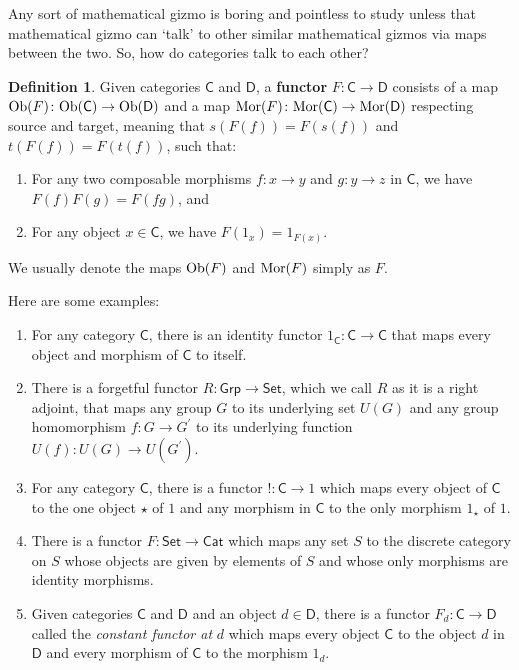 \documentclass[oneside,final]{ucr}
\theoremstyle{definition}
\newtheorem{definition}[theorem]{Definition}
\newcommand{\define}[1]{{\bf \boldmath #1}}
\begin{document}
{Any sort of mathematical gizmo is boring and pointless to study unless that mathematical gizmo can `talk' to other similar mathematical gizmos via maps between the two. So, how do categories talk to each other?

\begin{definition}
Given categories $\mathsf{C}$ and $\mathsf{D}$, a \define{functor} $F \colon \mathsf{C} \to \mathsf{D}$ consists of a map $\textnormal{Ob}(F) \colon \textnormal{Ob}(\mathsf{C}) \to \textnormal{Ob}(\mathsf{D})$ and a map $\textnormal{Mor}(F) \colon \textnormal{Mor}(\mathsf{C}) \to \textnormal{Mor}(\mathsf{D})$ respecting source and target, meaning that $s(F(f))=F(s(f))$ and $t(F(f))=F(t(f))$, such that:
\begin{enumerate}
\item{For any two composable morphisms $f \colon x \to y$ and $g \colon y \to z$ in $\mathsf{C}$, we have $F(f)F(g)=F(fg)$, and}
\item{For any object $x \in \mathsf{C}$, we have $F(1_x) = 1_{F(x)}$.}
\end{enumerate}
We usually denote the maps $\textnormal{Ob}(F)$ and $\textnormal{Mor}(F)$ simply as $F$.
\end{definition}
Here are some examples:
\begin{enumerate}
\item{For any category $\mathsf{C}$, there is an identity functor $1_\mathsf{C} \colon \mathsf{C} \to \mathsf{C}$ that maps every object and morphism of $\mathsf{C}$ to itself.}
\item{There is a forgetful functor $R \colon \mathsf{Grp} \to \mathsf{Set}$, which we call $R$ as it is a right adjoint, that maps any group $G$ to its underlying set $U(G)$ and any group homomorphism $f \colon G \to G^\prime$ to its underlying function $U(f) \colon U(G) \to U(G^\prime)$.}
\item{For any category $\mathsf{C}$, there is a functor $! \colon \mathsf{C} \to 1$ which maps every object of $\mathsf{C}$ to the one object $\star$ of $1$ and any morphism in $\mathsf{C}$ to the only morphism $1_\star$ of $1$.}
\item{There is a functor $F \colon \mathsf{Set} \to \mathsf{Cat}$ which maps any set $S$ to the discrete category on $S$ whose objects are given by elements of $S$ and whose only morphisms are identity morphisms.}
\item{Given categories $\mathsf{C}$ and $\mathsf{D}$ and an object $d \in \mathsf{D}$, there is a functor $F_d \colon \mathsf{C} \to \mathsf{D}$ called the \emph{constant functor at} $d$ which maps every object $\mathsf{C}$ to the object $d$ in $\mathsf{D}$ and every morphism of $\mathsf{C}$ to the morphism $1_d$.}
\end{enumerate}

}
\end{document}
